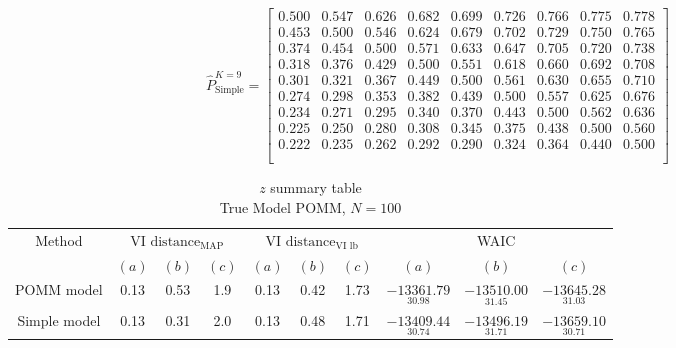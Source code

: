 \documentclass[11pt]{amsart}
\begin{document}
\[ 
\hat{P}^{K=9}_{\text{Simple}} = 
\left[\begin{array}{ccccccccc}
0.500 & 0.547 & 0.626 & 0.682 & 0.699 & 0.726 & 0.766 & 0.775 & 0.778 \\
0.453 & 0.500 & 0.546 & 0.624 & 0.679 & 0.702 & 0.729 & 0.750 & 0.765 \\
0.374 & 0.454 & 0.500 & 0.571 & 0.633 & 0.647 & 0.705 & 0.720 & 0.738 \\
0.318 & 0.376 & 0.429 & 0.500 & 0.551 & 0.618 & 0.660 & 0.692 & 0.708 \\
0.301 & 0.321 & 0.367 & 0.449 & 0.500 & 0.561 & 0.630 & 0.655 & 0.710 \\
0.274 & 0.298 & 0.353 & 0.382 & 0.439 & 0.500 & 0.557 & 0.625 & 0.676 \\
0.234 & 0.271 & 0.295 & 0.340 & 0.370 & 0.443 & 0.500 & 0.562 & 0.636 \\
0.225 & 0.250 & 0.280 & 0.308 & 0.345 & 0.375 & 0.438 & 0.500 & 0.560 \\
0.222 & 0.235 & 0.262 & 0.292 & 0.290 & 0.324 & 0.364 & 0.440 & 0.500 \\ \\\end{array}\right]
\]



\begin{table}[htbp]
\centering
\caption*{
{\large $z$ summary table} \\ 
{\small True Model POMM, $N=100$}
} 
\begin{tabular}{cccccccccc}
\toprule
\multirow{2}{*}{Method} & \multicolumn{3}{c}{
VI $\text{distance}_{\text{MAP}}$} & \multicolumn{3}{c}{
VI $\text{distance}_{\text{VI lb}}$} & \multicolumn{3}{c}{WAIC} \\
\cmidrule(lr){2-4} \cmidrule(lr){5-7} \cmidrule(lr){8-10}
& $(a)$ & $(b)$ & $(c)$ & $(a)$ & $(b)$ & $(c)$ & $(a)$ & $(b)$ & $(c)$ \\
\midrule
POMM model  &0.13 & 0.53 & 1.9 & 0.13 & 0.42 & 1.73  & $\underset{30.98}{-13361.79}$ & $\underset{31.45}{-13510.00}$ & $\underset{31.03}{-13645.28}$  \\
Simple model & 0.13 & 0.31 & 2.0 & 0.13 & 0.48 & 1.71 & $\underset{30.74}{-13409.44}$ & $\underset{31.71}{-13496.19}$ & $\underset{30.71}{-13659.10}$ \\
\bottomrule
\end{tabular}
\label{table:z_summary_POMM}
\end{table}
\end{document}
